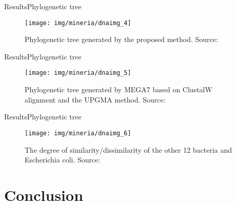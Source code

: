 \documentclass[10pt]{beamer}
\newcommand{\1}{
	\setbeamertemplate{background}{
		\texttt{[image: img/1\_dna]}
		\tikz[overlay] \fill[fill opacity=0.75,fill=white] (0,0) rectangle (-\paperwidth,\paperheight);
	}
}
\begin{document}
\begin{frame}{Results}{Phylogenetic tree}
\begin{figure}[]
	\centering
	\texttt{[image: img/mineria/dnaimg\_4]}
	\label{img:mot2}
	\caption{Phylogenetic tree generated by the proposed method. Source: \cite{delibacs2020dna} }
\end{figure}	
\end{frame}


\begin{frame}{Results}{Phylogenetic tree}
	\begin{figure}[]
		\centering
		\texttt{[image: img/mineria/dnaimg\_5]}
		\label{img:mot2}
		\caption{Phylogenetic tree generated by MEGA7 based on ClustalW alignment and the UPGMA method. Source: \cite{delibacs2020dna} }
	\end{figure}	
\end{frame}


\begin{frame}{Results}{Phylogenetic tree}
	\begin{figure}[]
		\centering
		\texttt{[image: img/mineria/dnaimg\_6]}
		\label{img:mot2}
		\caption{The degree of similarity/dissimilarity of the other 12 bacteria and Escherichia
			coli. Source: \cite{delibacs2020dna} }
	\end{figure}	
\end{frame}


\section{Conclusion}
\end{document}
